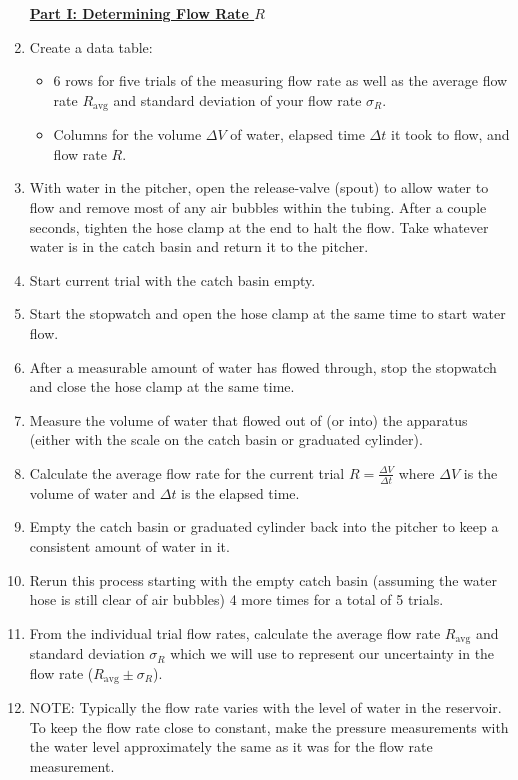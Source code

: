 \begin{enumerate}
\underline{\textbf{Part I: Determining Flow Rate $R$}}
\item Create a data table:
\begin{itemize}
    \item 6 rows for five trials of the measuring flow rate as well as the average flow rate $R_\text{avg}$ and standard deviation of your flow rate $\sigma_R$.
    \item Columns for the volume $\Delta V$ of water, elapsed time $\Delta t$ it took to flow, and flow rate $R$.
\end{itemize}
    \item With water in the pitcher, open the release-valve (spout) to allow water to flow and remove most of any air bubbles within the tubing. After a couple seconds, tighten the hose clamp at the end to halt the flow. Take whatever water is in the catch basin and return it to the pitcher.
    \item Start current trial with the catch basin empty.
    \item Start the stopwatch and open the hose clamp at the same time to start water flow.
    \item After a measurable amount of water has flowed through, stop the stopwatch and close the hose clamp at the same time.
    \item Measure the volume of water that flowed out of (or into) the apparatus (either with the scale on the catch basin or graduated cylinder).
    \item Calculate the average flow rate for the current trial $R = \frac{\Delta V}{\Delta t}$ where $\Delta V$ is the volume of water and $\Delta t$ is the elapsed time.
    \item Empty the catch basin or graduated cylinder back into the pitcher to keep a consistent amount of water in it.
    \item Rerun this process starting with the empty catch basin (assuming the water hose is still clear of air bubbles) 4 more times for a total of 5 trials.
    \item From the individual trial flow rates, calculate the average flow rate $R_\text{avg}$ and standard deviation $\sigma_R$ which we will use to represent our uncertainty in the flow rate ($R_\text{avg} \pm \sigma_R$).
    \item NOTE: Typically the flow rate varies with the level of water in the reservoir. To keep the flow rate close to constant, make the pressure measurements with the water level approximately the same as it was for the flow rate measurement.




\end{enumerate}
